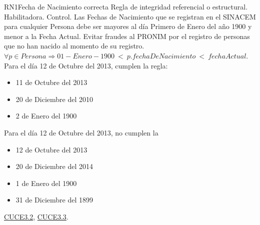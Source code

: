 \label{cap:reglasNegocio}


\begin{BussinesRule}{RN1}{Fecha de Nacimiento correcta}
\label{BR:RN1}
	\BRitem[Tipo:] Regla de integridad referencial o estructural. 
	\BRitem[Clase:] Habilitadora. 
	\BRitem[Nivel:] Control. %
	\BRitem[Descripción:]	Las Fechas de Nacimiento que se registran en el SINACEM para cualquier Persona debe ser mayores al día Primero de Enero del año 1900 y menor a la Fecha Actual.
	\BRitem[Motivación:] Evitar fraudes al PRONIM por el registro de personas que no han nacido al momento de su registro.
	\BRitem[Sentencia:] $\forall p \in Persona \Rightarrow 01-Enero-1900 ~<~ p.fechaDeNacimiento ~<~ fechaActual$.
	 Para el día 12 de Octubre del 2013, cumplen la regla:		
        \begin{itemize}
        	\item 11 de Octubre del 2013
			\item 20 de Diciembre del 2010
			\item 2 de Enero del 1900
        \end{itemize}
	
	 Para el día 12 de Octubre del 2013, no cumplen la 
		\begin{itemize}
        	\item 12 de Octubre del 2013
			\item 20 de Diciembre del 2014
			\item 1 de Enero del 1900
			\item 31 de Diciembre del 1899
        \end{itemize}
	
	 \hyperlink{CUCE3.2}{CUCE3.2}, \hyperlink{CUCE3.3}{CUCE3.3}.
\end{BussinesRule}
